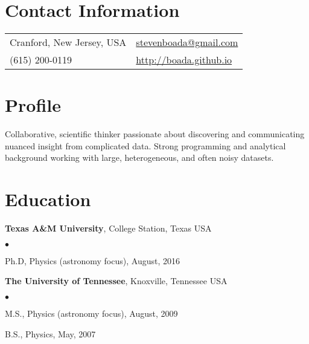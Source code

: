 \documentclass[margin,line, 11pt]{res}
\newenvironment{list2}{
  \begin{list}{$\bullet$}{%
      \setlength{\itemsep}{0in}
      \setlength{\parsep}{0in} \setlength{\parskip}{0in}
      \setlength{\topsep}{0in} \setlength{\partopsep}{0in}
      \setlength{\leftmargin}{0.2in}}}{\end{list}}
\begin{document}

\begin{resume}
\section{Contact Information}
\begin{tabular}{@{}p{3in}p{3in}}
Cranford, New Jersey, USA & \href{mailto:stevenboada@gmail.com}{stevenboada@gmail.com} \\
(615) 200-0119   & \url{http://boada.github.io} \\
\end{tabular}
\vspace*{-3mm}

\section{Profile}
Collaborative, scientific thinker passionate about discovering and communicating nuanced insight from complicated data. Strong programming and analytical background working with large, heterogeneous, and often noisy datasets.
\vspace*{-2.5mm}

\section{Education}
\textbf{Texas A\&M University}, College Station, Texas USA\\
\vspace*{-4mm}
\begin{list2}
	\item Ph.D, Physics (astronomy focus), August, 2016
\end{list2}
\vspace*{-4mm}

\textbf{The University of Tennessee}, Knoxville, Tennessee USA\\
\vspace*{-4mm}
\begin{list2}
	\item M.S., Physics (astronomy focus),  August, 2009
	\item B.S., Physics,  May, 2007
\end{list2}
\vspace*{-2.5mm}


\end{resume}
\end{document}

